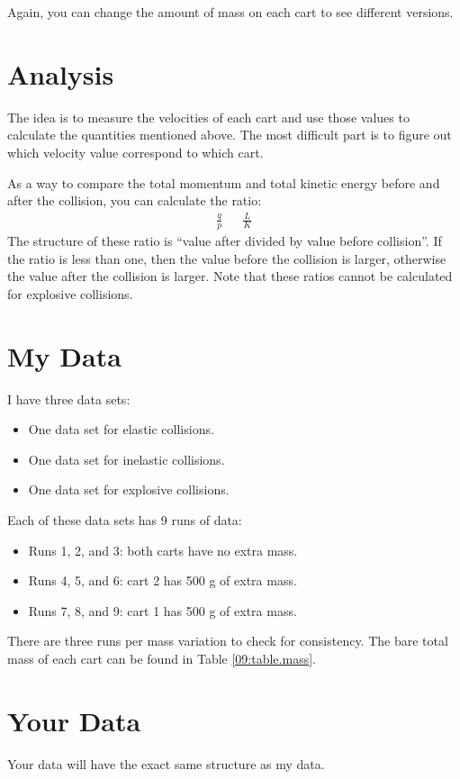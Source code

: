 Again, you can change the amount of mass on each cart to see different versions.
%
\section{Analysis}
%
The idea is to measure the velocities of each cart and use those values to calculate the quantities mentioned above. The most difficult part is to figure out which velocity value correspond to which cart.

As a way to compare the total momentum and total kinetic energy before and after the collision, you can calculate the ratio:
\begin{align}
    \frac{q}{p} && \frac{L}{K}
\end{align}
The structure of these ratio is ``value after divided by value before collision''. If the ratio is less than one, then the value before the collision is larger, otherwise the value after the collision is larger. Note that these ratios cannot be calculated for explosive collisions.
%
\section{My Data}
%
I have three data sets:
\begin{itemize}
    \item One data set for elastic collisions.
    \item One data set for inelastic collisions.
    \item One data set for explosive collisions.
\end{itemize}
Each of these data sets has 9 runs of data:
\begin{itemize}
    \item Runs 1, 2, and 3: both carts have no extra mass.
    \item Runs 4, 5, and 6: cart 2 has 500 g of extra mass.
    \item Runs 7, 8, and 9: cart 1 has 500 g of extra mass.
\end{itemize}
There are three runs per mass variation to check for consistency. The bare total mass of each cart can be found in Table \ref{09:table.mass}.
%
\section{Your Data}
%
Your data will have the exact same structure as my data.
%
\newpage
